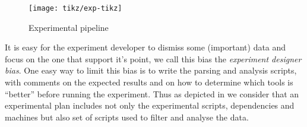 \begin{figure}[htb]
    \centering
    \texttt{[image: tikz/exp-tikz]}
    \caption{Experimental pipeline}
    \label{fig:exp-pipeline}
\end{figure}

It is easy for the experiment developer to dismiss some (important) data and
focus on the one that support it's point, we call this bias the
\emph{experiment designer bias}. One easy way to limit this bias is to write the parsing and analysis
scripts, with comments on the expected results and on how to determine which
tools is “better” before running the experiment. Thus as depicted in
 we consider that an experimental plan includes not only the
experimental scripts, dependencies and machines but also set of scripts used
to filter and analyse the data.

